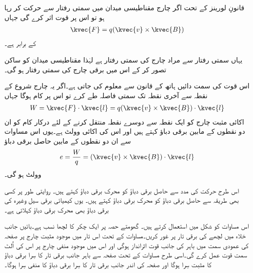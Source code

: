 قانونِ لورینز کے تحت اگر چارج   مقناطیسی میدان  میں سمتی رفتار  سے حرکت کر رہا ہو تو اس پر قوت   اثر کرے گی  جہاں
\begin{align}
\kvec{F}=q (\kvec{v} \times \kvec{B})
\end{align}
کے برابر ہے۔

یہاں سمتی رفتار سے مراد چارج کی سمتی رفتار ہے لہٰذا مقناطیسی میدان کو ساکن تصور کر کے اس میں برقی چارج کی سمتی رفتار  ہو گی۔

اس قوت کی سمت دائیں ہاتھ کے قانون سے معلوم کی جاتی ہے۔اگر یہ چارج شروع کے نقطہ سے آخری نقطہ تک سمتی فاصلہ   طے کرے تو اس پر  کام ہوگا جہاں
\begin{align}
W=\kvec{F} \cdot \kvec{l}=q (\kvec{v} \times \kvec{B}) \cdot \kvec{l}
\end{align}
اکائی مثبت چارج کو ایک نقطہ سے دوسرے نقطہ منتقل کرنے کے لئے درکار کام کو ان دو نقطوں کے مابین  برقی دباؤ کہتے ہیں اور اس کی اکائی وولٹ   ہے۔یوں اس مساوات سے ان دو نقطوں کے مابین حاصل برقی دباؤ
\begin{align}
e=\frac{W}{q}= (\kvec{v} \times \kvec{B}) \cdot \kvec{l}
\end{align}
وولٹ ہو گی۔

اس طرح حرکت کی مدد سے حاصل برقی دباؤ کو محرک برقی دباؤ  کہتے ہیں۔ روایتی طور پر کسی بھی طریقہ سے حاصل برقی دباؤ کو محرک برقی دباؤ کہتے ہیں۔ یوں کیمیائی برقی سیل وغیرہ کی برقی دباؤ بھی محرک برقی دباؤ کہلاتی  ہے۔

اس مساوات کو شکل  میں استعمال کرتے ہیں۔ گھومتے حصہ پر ایک چکر کا لچھا نسب ہے۔بائیں جانب خلاء میں لچھے کی برقی تار پر غور کریں۔مساوات  کے تحت اس تار میں موجود مثبت چارج پر صفحہ کی عمودی سمت میں باہر کی جانب قوت اثرانداز ہوگی اور اس میں موجود منفی چارج پر اس کی اُلٹ سمت قوت عمل کرے گی۔اسی طرح مساوات  کے تحت صفحہ سے باہر جانب برقی تار کا سِرا برقی دباؤ   کا مثبت سِرا ہوگا اور صفحہ کی اندر جانب برقی تار کا سِرا برقی دباؤ  کا منفی سِرا ہوگا۔

